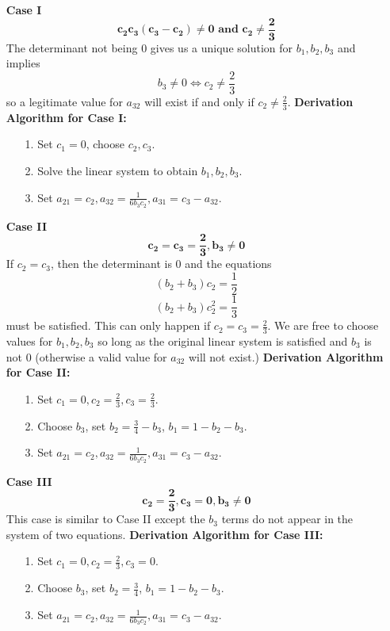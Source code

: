 \documentclass[12pt]{amsart}
\theoremstyle{definition}
\begin{document}
\begin{enumerate}
\item[\textbf{Case I}] $$\mathbf{c_2c_3(c_3 - c_2) \ne 0 \mbox{ and } c_2 \ne \frac{2}{3}}$$
The determinant not being 0 gives us a unique solution for $b_1, b_2, b_3$ and implies
$$ b_3 \ne 0 \iff c_2 \ne \frac{2}{3}$$
so a legitimate value for $a_{32}$ will exist if and only if $ c_2 \ne \frac{2}{3}$. \newline \newline
\textbf{Derivation Algorithm for Case I:}
\begin{enumerate}
	\item[1.] Set $c_1 = 0$, choose $c_2, c_3$.
	\item[2.] Solve the linear system to obtain $b_1, b_2, b_3$.
	\item[3.] Set $a_{21} = c_2, a_{32} = \frac{1}{6b_3c_2}, a_{31} = c_3 - a_{32}$. \newline
\end{enumerate}

\item[\textbf{Case II}]
$$\mathbf{c_2 = c_3 = \frac{2}{3}, b_3 \ne 0}$$
If $c_2 = c_3$, then the determinant is $0$ and the equations
$$(b_2 + b_3)c_2 = \frac{1}{2}$$
$$(b_2 + b_3)c_2^2 = \frac{1}{3}$$
must be satisfied. This can only happen if $c_2 = c_3 = \frac{2}{3}$.
We are free to choose values for $b_1, b_2, b_3$ so long as the original 
linear system is satisfied and $b_3$ is not 0
(otherwise a valid value for $a_{32}$ will not exist.) \newline \newline
\textbf{Derivation Algorithm for Case II:}
\begin{enumerate}
	\item[1.] Set $c_1 = 0, c_2 = \frac{2}{3}, c_3 = \frac{2}{3}$.
	\item[2.] Choose $b_3$, set $b_2 = \frac{3}{4} - b_3$, $b_1 = 1 - b_2 - b_3$.
	\item[3.] Set $a_{21} = c_2, a_{32} = \frac{1}{6b_3c_2}, a_{31} = c_3 - a_{32}$. \newline
\end{enumerate}


\item[\textbf{Case III}]
$$\mathbf{c_2 = \frac{2}{3}, c_3 = 0, b_3 \ne 0}$$
This case is similar to Case II except the $b_3$ terms do not appear in the system of two equations. \newline \newline
\textbf{Derivation Algorithm for Case III:}
\begin{enumerate}
	\item[1.] Set $c_1 = 0, c_2 = \frac{2}{3}, c_3 = 0$.
	\item[2.] Choose $b_3$, set $b_2 = \frac{3}{4}$, $b_1 = 1 - b_2 - b_3$. 
	\item[3.] Set $a_{21} = c_2, a_{32} = \frac{1}{6b_3c_2}, a_{31} = c_3 - a_{32}$. \newline
\end{enumerate}
\end{enumerate}
\end{document}
